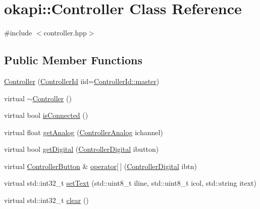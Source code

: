 \hypertarget{classokapi_1_1Controller}{}\section{okapi\+::Controller Class Reference}
\label{classokapi_1_1Controller}


{\ttfamily \#include $<$controller.\+hpp$>$}

\subsection*{Public Member Functions}
\begin{DoxyCompactItemize}
\item 
\mbox{\hyperlink{classokapi_1_1Controller_ab4fa918e91c0173123581cfe4dc9f5f6}{Controller}} (\mbox{\hyperlink{namespaceokapi_a56349a0562b06c6ffc742e94cb1e4361}{Controller\+Id}} iid=\mbox{\hyperlink{namespaceokapi_a56349a0562b06c6ffc742e94cb1e4361aeb0a191797624dd3a48fa681d3061212}{Controller\+Id\+::master}})
\item 
virtual \mbox{\hyperlink{classokapi_1_1Controller_ae624e3dccbefb1ff1126eaa142fd22c0}{$\sim$\+Controller}} ()
\item 
virtual bool \mbox{\hyperlink{classokapi_1_1Controller_a0cad97dfa473a47c4c3551374eb96e54}{is\+Connected}} ()
\item 
virtual float \mbox{\hyperlink{classokapi_1_1Controller_a7ae83fb44a837512cffc9610403c3dd6}{get\+Analog}} (\mbox{\hyperlink{namespaceokapi_afcc83d6a64f075a4dba212ff612c31d0}{Controller\+Analog}} ichannel)
\item 
virtual bool \mbox{\hyperlink{classokapi_1_1Controller_ada8fab201fa8a46aa7b76487f1d7a546}{get\+Digital}} (\mbox{\hyperlink{namespaceokapi_af5040b3f1f33d27698871423e1453ab6}{Controller\+Digital}} ibutton)
\item 
virtual \mbox{\hyperlink{classokapi_1_1ControllerButton}{Controller\+Button}} \& \mbox{\hyperlink{classokapi_1_1Controller_a88c9b0063ad8455840f9ac8c24610ff0}{operator\mbox{[}$\,$\mbox{]}}} (\mbox{\hyperlink{namespaceokapi_af5040b3f1f33d27698871423e1453ab6}{Controller\+Digital}} ibtn)
\item 
virtual std\+::int32\+\_\+t \mbox{\hyperlink{classokapi_1_1Controller_a91494385d809ca1f2c633ec231c44e07}{set\+Text}} (std\+::uint8\+\_\+t iline, std\+::uint8\+\_\+t icol, std\+::string itext)
\item 
virtual std\+::int32\+\_\+t \mbox{\hyperlink{classokapi_1_1Controller_a3af0986bb6287c8e24847a8c12bfcd43}{clear}} ()

\end{DoxyCompactItemize}
